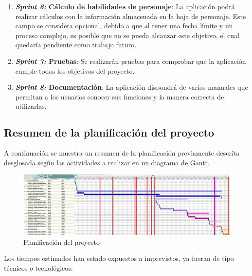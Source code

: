 \begin{enumerate}
    \item \textbf{\textit{Sprint 6:} Cálculo de habilidades de personaje}: La aplicación podrá realizar 
    cálculos con la información almacenada en la hoja de personaje. Este campo se considera opcional, debido a que 
    al tener una fecha límite y un proceso complejo, es posible que no se pueda alcanzar este objetivo, el cual quedaría 
    pendiente como trabajo futuro.

    \item \textbf{\textit{Sprint 7:} Pruebas}: Se realizarán pruebas para comprobar que la aplicación cumple todos los 
    objetivos del proyecto.

    \item \textbf{\textit{Sprint 8:} Documentación}: La aplicación dispondrá de varios manuales que permitan a los 
    usuarios conocer sus funciones y la manera correcta de utilizarlas.

\end{enumerate}

\subsection{Resumen de la planificación del proyecto}
A continuación se muestra un resumen de la planificación previamente descrita desglosada según 
las actividades a realizar en un diagrama de Gantt.

\newpage

\begin{landscape}
    \begin{figure}[H]
        \centering
        \includegraphics[scale=0.45]{Project_Planning/ARPEGOS_Gantt.png}
        \caption{Planificación del proyecto}
    \end{figure}
\end{landscape}
        

Los tiempos estimados han estado expuestos a imprevistos, ya fueran de tipo técnicos o tecnológicos:

